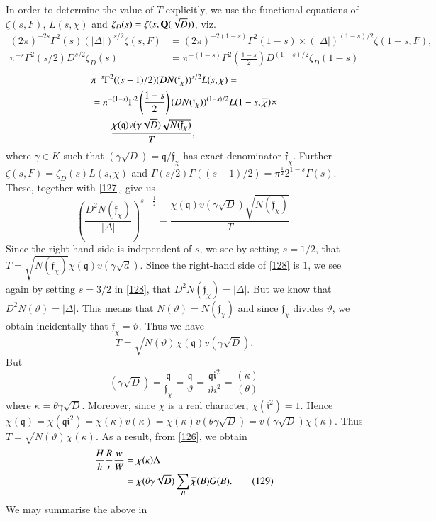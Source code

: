 In order to determine the value of $T$ explicitly, we use the
functional equations of $\zeta(s,F)$, $L(s,\chi)$ and
$\zeta_{D}(s)=\zeta(s,\mathbf{Q}(\sqrt{D}))$, viz.
{\fontsize{10}{12}\selectfont
\begin{align*}
(2\pi)^{-2s}\Gamma^{2}(s)(|\Delta|)^{s/2}\zeta(s,F) &=
  (2\pi)^{-2(1-s)}\Gamma^{2}(1-s)\times
  (|\Delta|)^{(1-s)/2}\zeta(1-s,F),\\
\pi^{-s}\Gamma^{2}(s/2)D^{s/2}\zeta_{D}(s) &= \pi^{-(1-s)}\Gamma^{2}\left(\frac{1-s}{2}\right)D^{(1-s)/2}\zeta_{D}(1-s)\tag{127}\label{127}
\end{align*}}
\begin{align*}
&\pi^{-s}\Gamma^{2}((s+1)/2)(DN(\mathfrak{f}_{\chi}))^{s/2}L(s,\chi)=\\
&=\pi^{-(1-s)}\Gamma^{2}\left(\frac{1-s}{2}\right)(DN(\mathfrak{f}_{\chi}))^{(1-s)/2}L(1-s,\overline{\chi})\times\\
&\qquad
  \frac{\chi(\mathfrak{q})v(\gamma\sqrt{D})\sqrt{N(\mathfrak{f}_{\chi})}}{T}, 
\end{align*}\pageoriginale
where $\gamma\in K$ such that
$(\gamma\sqrt{D})=\mathfrak{q}/\mathfrak{f}_{\chi}$ has exact
denominator $\mathfrak{f}_{\chi}$. Further
$\zeta(s,F)=\zeta_{D}(s)L(s,\chi)$ and
$\Gamma(s/2)\Gamma((s+1)/2)=\pi^{\frac{1}{2}}2^{1-s}\Gamma(s)$. These,
together with \eqref{127}, give us
\begin{equation*}
\left(\frac{D^{2}N(\mathfrak{f}_{\chi})}{|\Delta|}\right)^{s-\frac{1}{2}}=\frac{\chi(\mathfrak{q})v(\gamma\sqrt{D})\sqrt{N(\mathfrak{f}_{\chi})}}{T}.\tag{128}\label{128} 
\end{equation*}
Since the right hand side is independent of $s$, we see by setting
$s=1/2$, that
$T=\sqrt{N(\mathfrak{f}_{\chi})}\chi(\mathfrak{q})v(\gamma\sqrt{d})$. Since
the right-hand side of \eqref{128} is $1$, we see again by setting
$s=3/2$ in \eqref{128}, that
$D^{2}N(\mathfrak{f}_{\chi})=|\Delta|$. But we know that
$D^{2}N(\vartheta)=|\Delta|$. This means that
$N(\vartheta)=N(\mathfrak{f}_{\chi})$ and since $\mathfrak{f}_{\chi}$
divides $\vartheta$, we obtain incidentally that
$\mathfrak{f}_{\chi}=\vartheta$. Thus we have
$$
T=\sqrt{N(\vartheta)}\chi(\mathfrak{q})v(\gamma\sqrt{D}).
$$
But 
$$
(\gamma\sqrt{D})=\frac{\mathfrak{q}}{\mathfrak{f}_{\chi}}=\frac{\mathfrak{q}}{\vartheta}=\frac{\mathfrak{qi}^{2}}{\vartheta
  i^{2}}=\frac{(\kappa)}{(\theta)}
$$
where $\kappa=\theta\gamma\sqrt{D}$. Moreover, since $\chi$ is a real
character, $\chi(\mathfrak{i}^{2})=1$. Hence
$\chi(\mathfrak{q})=\chi(\mathfrak{qi}^{2})=\chi(\kappa)v(\kappa)=\chi(\kappa)v(\theta\gamma\sqrt{D})=v(\gamma\sqrt{D})\chi(\kappa)$. Thus
$T=\sqrt{N(\vartheta)}\chi(\kappa)$. As a result, from \eqref{126}, we
obtain
\begin{align*}
\frac{H}{h}\frac{R}{r}\frac{w}{W} &= \chi(\kappa)\Lambda\\
&= \chi(\theta\gamma\sqrt{D})\sum_{B}\overline{\chi}(B)G(B).\tag{129}\label{129}
\end{align*}
We may summarise the above in

